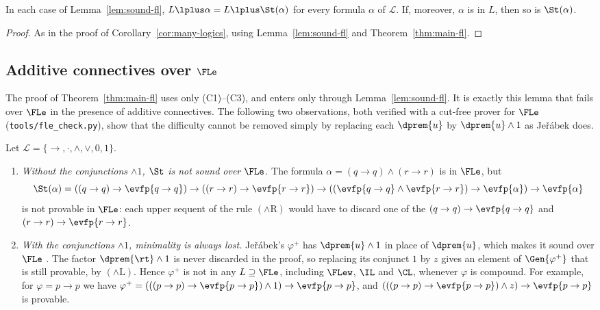 \begin{corollary}\label{cor:fl}
In each case of Lemma~\ref{lem:sound-fl}, $L\lplus \alpha=L\lplus \St(\alpha)$ for every
formula $\alpha$ of $\mathcal L$. If, moreover, $\alpha$ is  in $L$,
then so is $\St(\alpha)$.
\end{corollary}
\begin{proof}
As in the proof of Corollary~\ref{cor:many-logics},
using Lemma~\ref{lem:sound-fl} and Theorem~\ref{thm:main-fl}.
\end{proof}

\subsection{Additive connectives over \texorpdfstring{$\FLe$}{FLe}}\label{sec:additive}

The proof of Theorem~\ref{thm:main-fl} uses only (C1)--(C3), and 
enters only through Lemma~\ref{lem:sound-fl}. It is exactly this lemma that
fails over $\FLe$ in the presence of additive connectives. The
following two observations, both verified with a cut-free prover for
$\FLe$ (\texttt{tools/fle\_check.py}), show that the difficulty
cannot be removed simply by replacing each $\dprem{u}$ by
$\dprem{u}\wedge1$ as Jeřábek does.

\begin{remark}\label{rem:wrapper}
Let $\mathcal L=\{\to,\cdot,\wedge,\vee,0,1\}$.
\begin{enumerate}
\item[(a)] \emph{Without the conjunctions $\wedge1$, $\St$ is not sound over
  $\FLe$.} The formula $\alpha=(q\to q)\wedge(r\to r)$ is 
  in $\FLe$, but
  \[
  \St(\alpha)=((q\to q)\to \evfp{q\to q})\to((r\to r)\to \evfp{r\to r})
  \to((\evfp{q\to q}\wedge \evfp{r\to r})\to\evfp{\alpha})\to \evfp{\alpha}
  \]
  is not provable in $\FLe$: each upper sequent of the rule
  $({\wedge}\mathrm{R})$ would have to discard one of the 
  $(q\to q)\to\evfp{q\to q}$ and $(r\to r)\to\evfp{r\to r}$.
\item[(b)] \emph{With the conjunctions $\wedge1$, minimality is always lost.} Jeřábek's
  $\varphi^+$ has $\dprem{u}\wedge1$ in place of $\dprem{u}$, which makes it sound over
  $\FLe$ \cite[Thm.~3.8]{Jer16}. The factor $\dprem{\rt}\wedge1$
  is never discarded in the proof, so replacing its conjunct $1$ by $z$
  gives an element of $\Gen{\varphi^+}$ that is still provable, by
  $({\wedge}\mathrm{L})$. Hence $\varphi^+$ is not  in any 
  $L\supseteq\FLe$, including $\FLew$, $\IL$ and $\CL$,
  whenever $\varphi$ is compound. For example, for $\varphi=p\to p$ we have
  $\varphi^+=(((p\to p)\to \evfp{p\to p})\wedge 1)\to \evfp{p\to p}$, and
  $(((p\to p)\to \evfp{p\to p})\wedge z)\to \evfp{p\to p}$ is provable.
\end{enumerate}
\end{remark}

